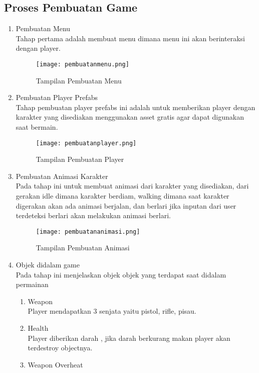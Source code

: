 \subsection{Proses Pembuatan Game}
\begin{enumerate}
    \item Pembuatan Menu\\
    Tahap pertama adalah membuat menu dimana menu ini akan berinteraksi dengan player.
    \begin{figure}[h]
        \centering
        \texttt{[image: pembuatanmenu.png]}
        \caption{Tampilan Pembuatan Menu}
        \label{fig:pembuatanmenu}
    \end{figure}
    \item Pembuatan Player Prefabs \\
    Tahap pembuatan player prefabs ini adalah untuk memberikan player dengan karakter yang disediakan menggunakan asset gratis agar dapat digunakan saat bermain.
    \newpage
    \begin{figure}[h]
        \centering
        \texttt{[image: pembuatanplayer.png]}
        \caption{Tampilan Pembuatan Player}
        \label{fig:pembuatanplayer}
    \end{figure}
    \item Pembuatan Animasi Karakter \\
    Pada tahap ini untuk membuat animasi dari karakter yang disediakan, dari gerakan idle dimana karakter berdiam, walking dimana saat karakter digerakan akan ada animasi berjalan, dan berlari jika inputan dari user terdeteksi berlari akan melakukan animasi berlari.
    \begin{figure}[h]
        \centering
        \texttt{[image: pembuatananimasi.png]}
        \caption{Tampilan Pembuatan Animasi}
        \label{fig:pembuatananimasi}
    \end{figure}
    \item Objek didalam game \\ 
    Pada tahap ini menjelaskan objek objek yang terdapat saat didalam permainan
    \begin{enumerate}
        \item Weapon\\
        Player mendapatkan 3 senjata yaitu pistol, rifle, pisau.
        \item Health \\
        Player diberikan darah , jika darah berkurang makan player akan terdestroy objectnya.
        \item Weapon Overheat \\

\end{enumerate}
\end{enumerate}

